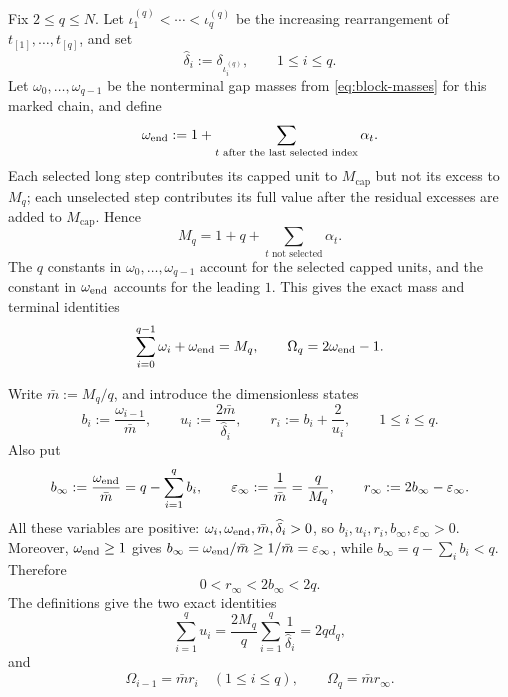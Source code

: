 \documentclass[11pt]{article}
\theoremstyle{definition}
\theoremstyle{remark}
\newcommand{\rankmass}{M}
\newcommand{\rankdens}{d}
\begin{document}
Fix \(2\le q\le N\).  Let
\(\iota_1^{(q)}<\cdots<\iota_q^{(q)}\) be the increasing rearrangement of
\(t_{[1]},\ldots,t_{[q]}\), and set
\[
 \widehat\delta_i:=\delta_{\iota_i^{(q)}},\qquad 1\le i\le q.
\]
Let \(\omega_0,\ldots,\omega_{q-1}\) be the nonterminal gap masses from
\eqref{eq:block-masses} for this marked chain, and define
\[
 \omega_{\rm end}
 :=1+\sum_{t\text{ after the last selected index}}\alpha_t.
\]
Each selected long step contributes its capped unit to
\(\rankmass_{\mathrm{cap}}\) but not its excess to \(\rankmass_q\); each
unselected step contributes its full value after the residual excesses are
added to \(\rankmass_{\mathrm{cap}}\).  Hence
\[
 \rankmass_q=1+q+\sum_{t\text{ not selected}}\alpha_t.
\]
The \(q\) constants in \(\omega_0,\ldots,\omega_{q-1}\) account for the
selected capped units, and the constant in \(\omega_{\rm end}\) accounts
for the leading \(1\).
This gives the exact mass and terminal identities
\begin{equation}
 \sum_{i=0}^{q-1}\omega_i+\omega_{\rm end}=\rankmass_q,
 \qquad
 \Omega_q=2\omega_{\rm end}-1.
 \label{eq:mass-partition}
\end{equation}

Write \(\bar m:=\rankmass_q/q\), and introduce the dimensionless states
\begin{equation}
 b_i:=\frac{\omega_{i-1}}{\bar m},
 \qquad
 u_i:=\frac{2\bar m}{\widehat\delta_i},
 \qquad
 r_i:=b_i+\frac2{u_i},
 \qquad 1\le i\le q.
 \label{eq:x-v-rho}
\end{equation}
Also put
\begin{equation}
 b_\infty:=\frac{\omega_{\rm end}}{\bar m}
 =q-\sum_{i=1}^q b_i,
 \qquad
 \varepsilon_\infty:=\frac1{\bar m}=\frac q{\rankmass_q},
 \qquad
 r_\infty:=2b_\infty-\varepsilon_\infty.
 \label{eq:z-eps-kappa}
\end{equation}
All these variables are positive: \(\omega_i,\omega_{\rm end},\bar m,
\widehat\delta_i>0\), so
\(b_i,u_i,r_i,b_\infty,\varepsilon_\infty>0\).  Moreover,
\(\omega_{\rm end}\ge1\) gives
\(b_\infty=\omega_{\rm end}/\bar m\ge1/\bar m=\varepsilon_\infty\),
while \(b_\infty=q-\sum_i b_i<q\).  Therefore
\begin{equation}
  0<r_\infty<2b_\infty<2q.
  \label{eq:kappa-bound}
\end{equation}
The definitions give the two exact identities
\begin{equation}
 \sum_{i=1}^q u_i
 =\frac{2\rankmass_q}{q}
   \sum_{i=1}^q\frac1{\widehat\delta_i}
 =2q\rankdens_q,
 \label{eq:v-sum}
\end{equation}
and
\begin{equation}
  \Omega_{i-1}=\bar m r_i\quad(1\le i\le q),
  \qquad \Omega_q=\bar m r_\infty.
  \label{eq:H-normalized}
\end{equation}
\end{document}
